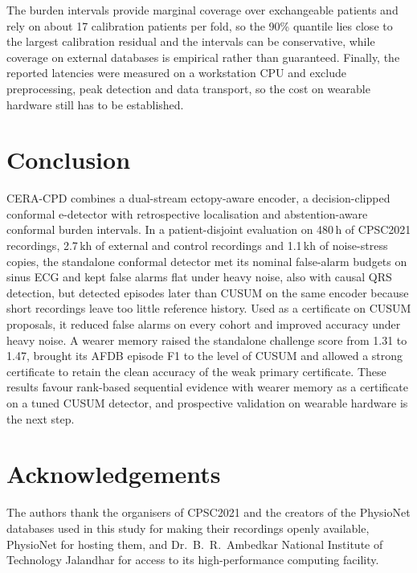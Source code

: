 \documentclass[preprint,12pt]{elsarticle}
\newcommand{\method}{CERA-CPD}
\newcommand{\1}{\mathbf{1}}
\begin{document}
The burden intervals provide marginal coverage over exchangeable patients and rely on about 17 calibration patients per fold, so the 90\% quantile lies close to the largest calibration residual and the intervals can be conservative, while coverage on external databases is empirical rather than guaranteed. Finally, the reported latencies were measured on a workstation CPU and exclude preprocessing, peak detection and data transport, so the cost on wearable hardware still has to be established.

\section{Conclusion}
\label{sec:conclusion}
\method{} combines a dual-stream ectopy-aware encoder, a decision-clipped conformal e-detector with retrospective localisation and abstention-aware conformal burden intervals. In a patient-disjoint evaluation on 480\,h of CPSC2021 recordings, 2.7\,kh of external and control recordings and 1.1\,kh of noise-stress copies, the standalone conformal detector met its nominal false-alarm budgets on sinus ECG and kept false alarms flat under heavy noise, also with causal QRS detection, but detected episodes later than CUSUM on the same encoder because short recordings leave too little reference history. Used as a certificate on CUSUM proposals, it reduced false alarms on every cohort and improved accuracy under heavy noise. A wearer memory raised the standalone challenge score from 1.31 to 1.47, brought its AFDB episode F1 to the level of CUSUM and allowed a strong certificate to retain the clean accuracy of the weak primary certificate. These results favour rank-based sequential evidence with wearer memory as a certificate on a tuned CUSUM detector, and prospective validation on wearable hardware is the next step.

\section*{Acknowledgements}
The authors thank the organisers of CPSC2021 and the creators of the PhysioNet databases used in this study for making their recordings openly available, PhysioNet \cite{goldberger2000physionet} for hosting them, and Dr.\ B.\ R.\ Ambedkar National Institute of Technology Jalandhar for access to its high-performance computing facility.
\end{document}
